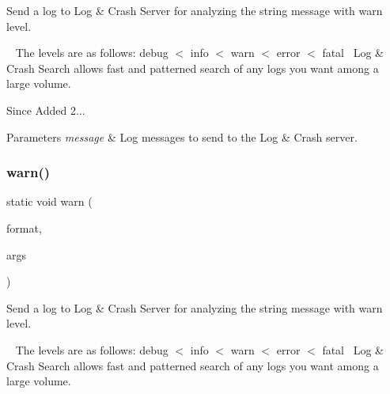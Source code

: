 Send a log to Log \& Crash Server for analyzing the string message with warn level. 

~\newline
 The levels are as follows\+: debug $<$ info $<$ warn $<$ error $<$ fatal~\newline
 Log \& Crash Search allows fast and patterned search of any logs you want among a large volume.

\begin{DoxySince}{Since}
Added 2... 
\end{DoxySince}

\begin{DoxyParams}{Parameters}
{\em message} & Log messages to send to the Log \& Crash server. \\
\hline
\end{DoxyParams}
\mbox{\label{classcom_1_1toast_1_1android_1_1gamebase_1_1_gamebase_1_1_logger_a3fe80dda3a14124e6e0ec1309597be55}} 
\subsubsection{\texorpdfstring{warn()}{warn()}\hspace{0.1cm}{\footnotesize\ttfamily [2/3]}}
{\footnotesize\ttfamily static void warn (\begin{DoxyParamCaption}\item[{@Non\+Null final String}]{format,  }\item[{@Non\+Null final Object...}]{args }\end{DoxyParamCaption})\hspace{0.3cm}{\ttfamily [static]}}



Send a log to Log \& Crash Server for analyzing the string message with warn level. 

~\newline
 The levels are as follows\+: debug $<$ info $<$ warn $<$ error $<$ fatal~\newline
 Log \& Crash Search allows fast and patterned search of any logs you want among a large volume.

